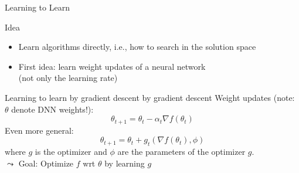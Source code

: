 \begin{frame}[c]{Learning to Learn}

\begin{block}{Idea}
\begin{itemize}
  \item Learn algorithms directly, i.e., how to search in the solution space
  \item First idea: learn weight updates of a neural network\\
  (not only the learning rate)
\end{itemize}
\end{block}

\pause

\begin{block}{Learning to learn by gradient descent by gradient descent\newline {}}
Weight updates (note: \alert{$\theta$ denote DNN weights!}):
\begin{equation}
\theta_{t+1} = \theta_t - \alpha_t \nabla f(\theta_t) \nonumber
\end{equation}
\pause
Even more general:
\begin{equation}
\theta_{t+1} = \theta_t + g_t(\nabla f(\theta_t), \phi) \nonumber
\end{equation}
where $g$ is the optimizer and $\phi$ are the parameters of the optimizer $g$.\\
\pause
$\leadsto$ \alert{Goal: Optimize $f$ wrt $\theta$ by learning $g$}
\end{block}

\end{frame}

